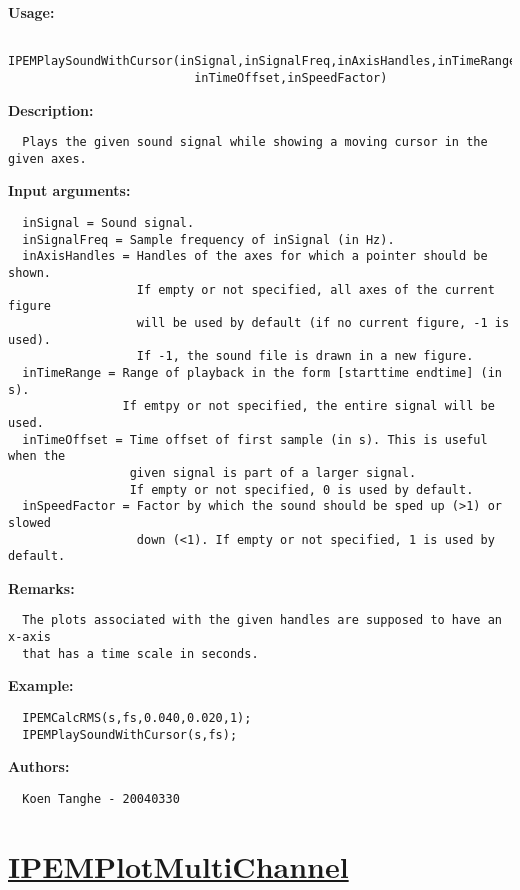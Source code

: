 \textbf{Usage:}
\begin{verbatim}  IPEMPlaySoundWithCursor(inSignal,inSignalFreq,inAxisHandles,inTimeRange,
                          inTimeOffset,inSpeedFactor)

\end{verbatim}
\textbf{Description:}
\begin{verbatim}  Plays the given sound signal while showing a moving cursor in the given axes.

\end{verbatim}
\textbf{Input arguments:}
\begin{verbatim}  inSignal = Sound signal.
  inSignalFreq = Sample frequency of inSignal (in Hz).
  inAxisHandles = Handles of the axes for which a pointer should be shown.
                  If empty or not specified, all axes of the current figure
                  will be used by default (if no current figure, -1 is used).
                  If -1, the sound file is drawn in a new figure.
  inTimeRange = Range of playback in the form [starttime endtime] (in s).
                If emtpy or not specified, the entire signal will be used.
  inTimeOffset = Time offset of first sample (in s). This is useful when the
                 given signal is part of a larger signal.
                 If empty or not specified, 0 is used by default.
  inSpeedFactor = Factor by which the sound should be sped up (>1) or slowed
                  down (<1). If empty or not specified, 1 is used by default.

\end{verbatim}
\textbf{Remarks:}
\begin{verbatim}  The plots associated with the given handles are supposed to have an x-axis
  that has a time scale in seconds.

\end{verbatim}
\textbf{Example:}
\begin{verbatim}  IPEMCalcRMS(s,fs,0.040,0.020,1);
  IPEMPlaySoundWithCursor(s,fs);

\end{verbatim}
\textbf{Authors:}
\begin{verbatim}  Koen Tanghe - 20040330
\end{verbatim}


\newpage
\section*{\hyperlink{Concepts:IPEMPlotMultiChannel}{IPEMPlotMultiChannel}}
\hypertarget{FuncRef:IPEMPlotMultiChannel}{}

